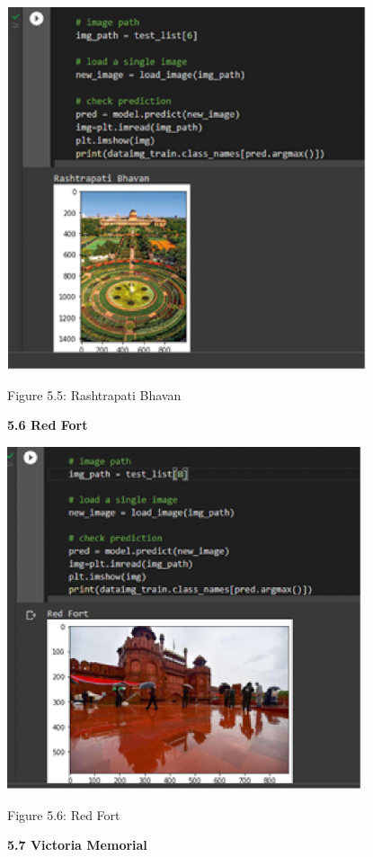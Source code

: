 \documentclass[10pt]{article} %
\begin{document}
\newline \includegraphics*[width=4.16in, height=4.20in, keepaspectratio=false]{image14}

\noindent Figure 5.5: Rashtrapati Bhavan

\newpage
\textbf{5.6 Red Fort}\newline

 \includegraphics*[width=4.10in, height=3.97in, keepaspectratio=false]{image15}

\noindent Figure 5.6: Red Fort

\noindent 

\newpage \textbf{5.7 Victoria Memorial} \newline
\end{document}
